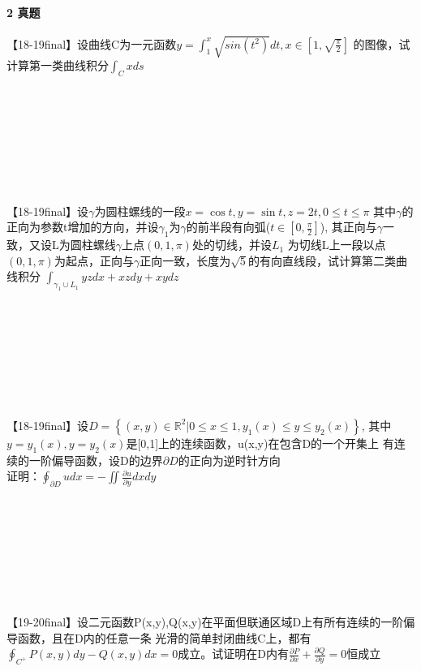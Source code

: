 \documentclass[12pt]{scrartcl}
\begin{document}
{\paragraph*{\large 2 真题}\leavevmode \newline
【18-19final】设曲线C为一元函数$y=\int _1^x\sqrt{sin(t^2)}dt,x\in[1,\sqrt{\frac{\pi}{2}}]$
的图像，试计算第一类曲线积分$\int _Cxds$
\\
\\
\\
\\
\\
\\
\\
\\
\\
【18-19final】设$\gamma $为圆柱螺线的一段$x=\cos t,y=\sin t,z=2t,0\leq t\leq \pi$
其中$\gamma $的正向为参数t增加的方向，并设$\gamma_1 $为$\gamma $的前半段有向弧($t \in[0,\frac{\pi}{2}]$),
其正向与$\gamma $一致，又设L为圆柱螺线$\gamma $上点$(0,1,\pi)$处的切线，并设$L_1$
为切线L上一段以点$(0,1,\pi)$为起点，正向与$\gamma $正向一致，长度为$\sqrt{5}$的有向直线段，试计算第二类曲线积分
$\int_{\gamma _1\cup L_1}yzdx+xzdy+xydz $
\\
\\
\\
\\
\\
\\
\\
\\
\\
【18-19final】设$D=\left\{(x,y)\in\mathbb{R} ^2|0\leq x \leq 1,y_1(x)\leq y \leq y_2(x) \right\} $,
其中$y=y_1(x),y=y_2(x)$是[0,1]上的连续函数，u(x,y)在包含D的一个开集上
有连续的一阶偏导函数，设D的边界$\partial D$的正向为逆时针方向\\
证明：$\oint _{\partial D}udx=-\iint \frac{\partial u}{\partial y}dxdy$
\\
\\
\\
\\
\\
\\
\\
\\
\\
【19-20final】设二元函数P(x,y),Q(x,y)在平面但联通区域D上有所有连续的一阶偏导函数，且在D内的任意一条
光滑的简单封闭曲线C上，都有$\oint _{C^+}P(x,y)dy-Q(x,y)dx=0$成立。试证明在D内有$\frac{\partial P}{\partial x}+\frac{\partial Q}{\partial y}=0$恒成立 
\\
}
\end{document}
